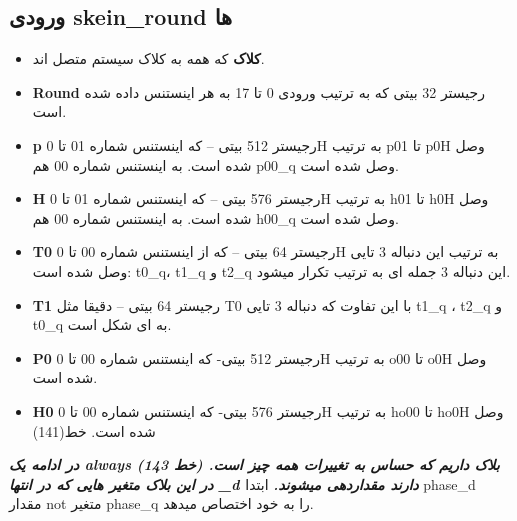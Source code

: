 \subsection{
	ورودی skein\_round ها
}
\begin{itemize}
	\item
	      \textbf{کلاک}
	      که همه به کلاک سیستم متصل اند.
	\item
	      \textbf{Round}
	      رجیستر 32 بیتی که به ترتیب ورودی 0 تا 17 به هر اینستنس داده شده است.
	\item
	      \textbf{p}
	      رجیستر 512 بیتی – که اینستنس شماره 01 تا 0H به ترتیب p01 تا p0H وصل شده است. به اینستنس شماره 00 هم p00\_q وصل شده است.
	\item
	      \textbf{H}
	      رجیستر 576 بیتی – که اینستنس شماره 01 تا 0H به ترتیب h01 تا h0H وصل شده است. به اینستنس شماره 00 هم h00\_q وصل شده است.
	\item
	      \textbf{T0}
	      رجیستر 64 بیتی –   که از اینستنس شماره 00 تا 0H به ترتیب این دنباله 3 تایی وصل شده است: t0\_q، t1\_q و t2\_q این دنباله 3 جمله ای به ترتیب تکرار میشود.
	\item
	      \textbf{T1}
	      رجیستر 64 بیتی – دقیقا مثل T0 با این تفاوت که دنباله 3 تایی t1\_q ، t2\_q و t0\_q به ای شکل است.
	\item
	      \textbf{P0}
	      رجیستر 512 بیتی- که اینستنس شماره 00 تا 0H به ترتیب o00 تا o0H وصل شده است. 
	\item
	      \textbf{H0}
	      رجیستر 576 بیتی- که اینستنس شماره 00 تا 0H به ترتیب ho00 تا ho0H وصل شده است. خط(141)
	      
\end{itemize}
\textit{\textbf{
	در ادامه یک always بلاک داریم که حساس به تغییرات همه چیز است. (خط 143)
	در این بلاک متغیر هایی که در انتها
	\_d
دارند مقداردهی میشوند.}}
ابتدا phase\_d مقدار not متغیر phase\_q را به خود اختصاص میدهد.
